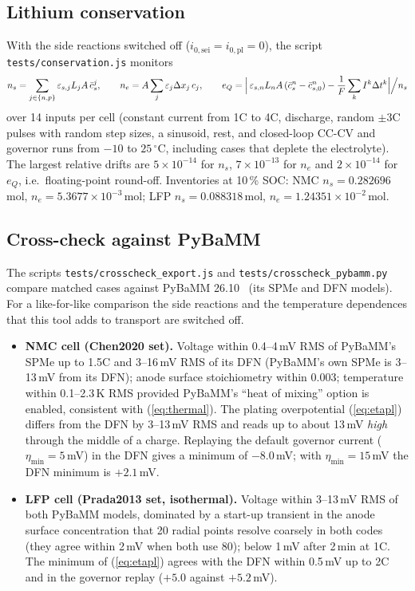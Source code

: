 \documentclass[11pt]{article}
\newcommand{\eps}{\varepsilon}
\newcommand{\code}[1]{\texttt{#1}}
\begin{document}
\subsection{Lithium conservation}
With the side reactions switched off ($i_{0,\mathrm{sei}}=i_{0,\mathrm{pl}}=0$), the script \code{tests/conservation.js} monitors
\begin{equation}
n_s=\sum_{j\in\{n,p\}}\eps_{s,j}L_jA\,\bar c_s^{j},\qquad
n_e=A\sum_{j}\eps_j\Delta x_j\,c_j,\qquad
e_Q=\Bigl|\,\eps_{s,n}L_nA\,(\bar c_s^{n}-\bar c_{s,0}^{n})-\frac{1}{F}\sum_k I^{k}\Delta t^{k}\Bigr|\Big/n_s
\end{equation}
over 14 inputs per cell (constant current from 1C to 4C, discharge, random $\pm3$C pulses with random step sizes, a sinusoid, rest, and closed-loop CC-CV and governor runs from $-10$ to $25\,^\circ$C, including cases that deplete the electrolyte). The largest relative drifts are $5\times10^{-14}$ for $n_s$, $7\times10^{-13}$ for $n_e$ and $2\times10^{-14}$ for $e_Q$, i.e.\ floating-point round-off. Inventories at 10\,\% SOC: NMC $n_s=0.282696$\,mol, $n_e=5.3677\times10^{-3}$\,mol; LFP $n_s=0.088318$\,mol, $n_e=1.24351\times10^{-2}$\,mol.

\subsection{Cross-check against PyBaMM}\label{sec:crosscheck}
The scripts \code{tests/crosscheck\_export.js} and \code{tests/crosscheck\_pybamm.py} compare matched cases against PyBaMM 26.10~\cite{pybamm} (its SPMe and DFN models). For a like-for-like comparison the side reactions and the temperature dependences that this tool adds to transport are switched off.
\begin{itemize}[leftmargin=*]
\item \textbf{NMC cell (Chen2020 set).} Voltage within 0.4--4\,mV RMS of PyBaMM's SPMe up to 1.5C and 3--16\,mV RMS of its DFN (PyBaMM's own SPMe is 3--13\,mV from its DFN); anode surface stoichiometry within 0.003; temperature within 0.1--2.3\,K RMS provided PyBaMM's ``heat of mixing'' option is enabled, consistent with (\ref{eq:thermal}). The plating overpotential (\ref{eq:etapl}) differs from the DFN by 3--13\,mV RMS and reads up to about 13\,mV \emph{high} through the middle of a charge. Replaying the default governor current ($\eta_{\min}=5$\,mV) in the DFN gives a minimum of $-8.0$\,mV; with $\eta_{\min}=15$\,mV the DFN minimum is $+2.1$\,mV.
\item \textbf{LFP cell (Prada2013 set, isothermal).} Voltage within 3--13\,mV RMS of both PyBaMM models, dominated by a start-up transient in the anode surface concentration that 20 radial points resolve coarsely in both codes (they agree within 2\,mV when both use 80); below 1\,mV after 2\,min at 1C. The minimum of (\ref{eq:etapl}) agrees with the DFN within 0.5\,mV up to 2C and in the governor replay ($+5.0$ against $+5.2$\,mV).
\end{itemize}
\end{document}
